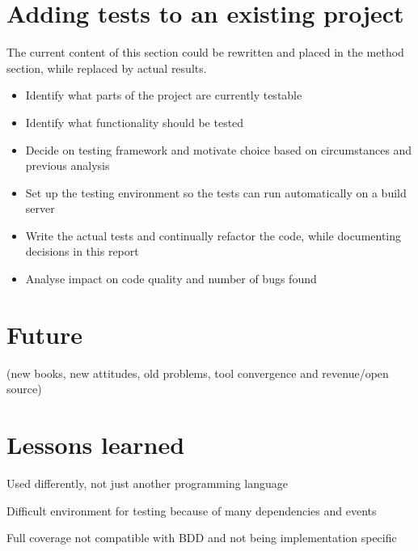 \documentclass[11pt]{article}
\begin{document}
\section{Adding tests to an existing project}

The current content of this section could be rewritten and placed in the method section, while replaced by actual results.

\begin{itemize}
  \item Identify what parts of the project are currently testable
  \item Identify what functionality should be tested
  \item Decide on testing framework and motivate choice based on circumstances and previous analysis
  \item Set up the testing environment so the tests can run automatically on a build server
  \item Write the actual tests and continually refactor the code, while documenting decisions in this report
  \item Analyse impact on code quality and number of bugs found
\end{itemize}


\section{Future}

(new books, new attitudes, old problems, tool convergence and revenue/open source)

\section{Lessons learned}

Used differently, not just another programming language

Difficult environment for testing because of many dependencies and events

Full coverage not compatible with BDD and not being implementation specific

\printbibliography
\end{document}
